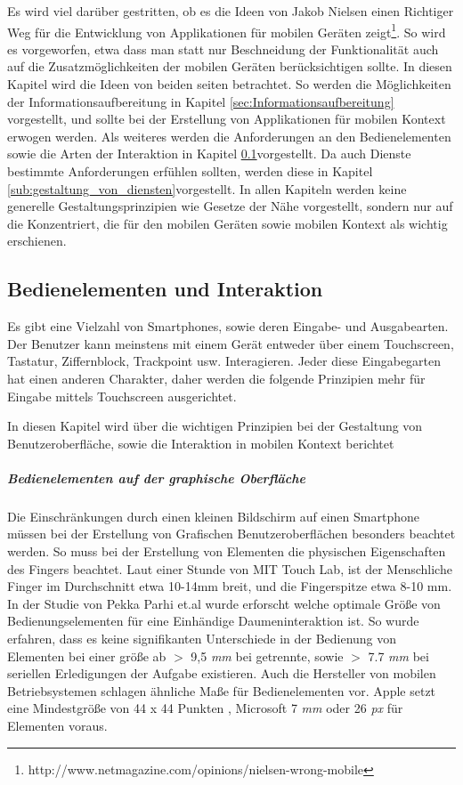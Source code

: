 Es wird viel darüber gestritten, ob es die Ideen von Jakob Nielsen einen Richtiger Weg für die Entwicklung von Applikationen für mobilen Geräten zeigt\footnote{http://www.netmagazine.com/opinions/nielsen-wrong-mobile}. So wird es vorgeworfen, etwa dass man statt nur Beschneidung der Funktionalität auch auf die Zusatzmöglichkeiten der mobilen Geräten berücksichtigen sollte. In diesen Kapitel wird die Ideen von beiden seiten betrachtet. So werden die Möglichkeiten der Informationsaufbereitung in Kapitel \ref{sec:Informationsaufbereitung} vorgestellt, und sollte bei der Erstellung von Applikationen für mobilen Kontext erwogen werden. Als weiteres werden die Anforderungen an den Bedienelementen sowie die Arten der Interaktion in Kapitel \ref{sub:Benutzerschnittstellen}vorgestellt. Da auch Dienste bestimmte Anforderungen erfühlen sollten, werden diese in Kapitel \ref{sub:gestaltung_von_diensten}vorgestellt. In allen Kapiteln werden keine generelle Gestaltungsprinzipien wie Gesetze der Nähe vorgestellt, sondern nur auf die Konzentriert, die für den mobilen Geräten sowie mobilen Kontext als wichtig erschienen.

\subsection{Bedienelementen und Interaktion}
\label{sub:Benutzerschnittstellen}

Es gibt eine Vielzahl von Smartphones, sowie deren Eingabe- und Ausgabearten. Der Benutzer kann meinstens mit einem Gerät entweder über einem Touchscreen, Tastatur, Ziffernblock, Trackpoint usw. Interagieren. Jeder diese Eingabegarten hat einen anderen Charakter, daher werden die folgende Prinzipien mehr für Eingabe mittels Touchscreen ausgerichtet.

In diesen Kapitel wird über die wichtigen Prinzipien bei der Gestaltung von Benutzeroberfläche, sowie die Interaktion in mobilen Kontext berichtet

\subparagraph{Bedienelementen auf der graphische Oberfläche} 
\label{subp:gro_ere_interface_elementen}

Die Einschränkungen durch einen kleinen Bildschirm auf einen Smartphone müssen bei der Erstellung von Grafischen Benutzeroberflächen besonders beachtet werden. So muss bei der Erstellung von Elementen die physischen Eigenschaften des Fingers beachtet. Laut einer Stunde von MIT Touch Lab, ist der Menschliche Finger im Durchschnitt etwa 10-14mm breit, und die Fingerspitze etwa 8-10 mm\cite{Srinivasan:2003uu}. In der Studie von Pekka Parhi et.al \cite{Parhi:2006gh} wurde erforscht welche optimale Größe von Bedienungselementen für eine Einhändige Daumeninteraktion ist. So wurde erfahren, dass es keine signifikanten Unterschiede in der Bedienung von Elementen bei einer größe ab $>$ 9,5 \textit{mm} bei getrennte, sowie $>$ 7.7 \textit{mm} bei seriellen Erledigungen der Aufgabe existieren. Auch die Hersteller von mobilen Betriebsystemen schlagen ähnliche Maße für Bedienelementen vor. Apple setzt eine Mindestgröße von 44 x 44 Punkten \cite{Apple}, Microsoft 7 \textit{mm} oder 26 \textit{px}\cite{lukeGUI} für Elementen voraus.

